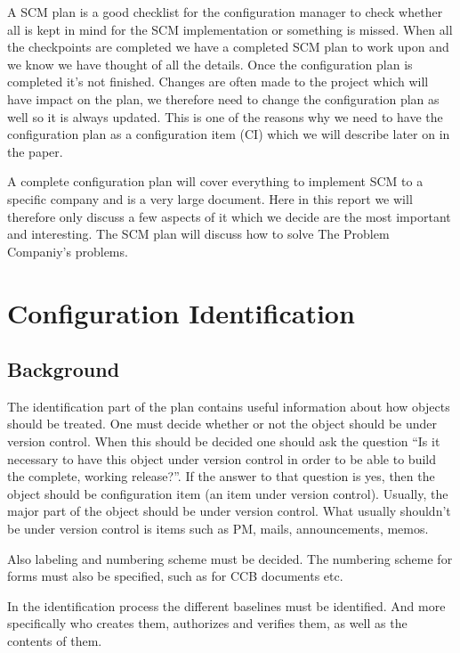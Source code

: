 \documentclass[a4paper,11pt]{article}
\begin{document}
A SCM plan is a good checklist for the configuration manager to check whether all is kept in mind for the SCM implementation or something is missed. When all the checkpoints are completed we have a completed SCM plan to work upon and we know we have thought of all the details. Once the configuration plan is completed it’s not finished. Changes are often made to the project which will have impact on the plan, we therefore need to change the configuration plan as well so it is always updated. This is one of the reasons why we need to have the configuration plan as a configuration item (CI) which we will describe later on in the paper.

A complete configuration plan will cover everything to implement SCM to a specific company and is a very large document. Here in this report we will therefore only discuss a few aspects of it which we decide are the most important and interesting. The SCM plan will discuss how to solve The Problem Companiy's problems.



\section{Configuration Identification}

\subsection{Background}
The identification part of the plan contains useful information about how objects should be treated. One must decide whether or not the object should be under version control. When this should be decided one should ask the question ``Is it necessary to have this object under version control in order to be able to build the complete, working release?''. If the answer to that question is yes, then the object should be configuration item (an item under version control).
Usually, the major part of the object should be under version control. What usually shouldn't be under version control is items such as PM, mails, announcements, memos.

Also labeling and numbering scheme must be decided. The numbering scheme for forms must also be specified, such as for CCB documents etc.

In the identification process the different baselines must be identified. And more specifically who creates them, authorizes and verifies them, as well as the contents of them.\cite{cagan}
\end{document}
